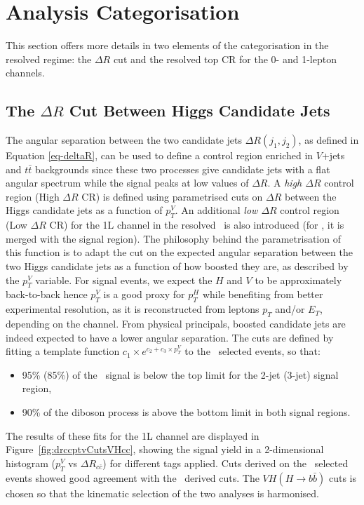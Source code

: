 \clearpage
\section{Analysis Categorisation}\label{ap-vhCat}
This section offers more details in two elements of the categorisation in the resolved regime: the $\Delta R$ cut and the resolved top CR for the 0- and 1-lepton channels.

\subsection{The $\Delta R$ Cut Between Higgs Candidate Jets}\label{ap-sec-vh-deltaR}
The angular separation between the two candidate jets $\Delta R(j_1, j_2)$, as defined in Equation \ref{eq-deltaR}, can be used to define a control region enriched in $V$+jets and $t\bar{t}$ backgrounds since these two processes give candidate jets with a flat angular spectrum while the signal peaks at low values of $\Delta R$. A \textit{high $\Delta R$} control region (High $\Delta R$ CR) is defined using parametrised cuts on $\Delta R$ between the Higgs candidate jets as a function of $p_T^V$. An additional \textit{low $\Delta R$} control region (Low $\Delta R$ CR) for the 1L channel in the resolved \vhb\ is also introduced (for \vhc, it is merged with the signal region). The philosophy behind the parametrisation of this function is to adapt the cut on the expected angular separation between the two Higgs candidate jets as a function of how boosted they are, as described by the $p_T^V$ variable. For signal events, we expect the $H$ and $V$ to be approximately back-to-back hence $p_T^V$ is a good proxy for $p_T^H$ while benefiting from better experimental resolution, as it is reconstructed from leptons $p_T$ and/or $E_T$, depending on the channel. From physical principals, boosted candidate jets are indeed expected to have a lower angular separation. The cuts are defined by fitting a template function $ c_1 \times e^{c_2 + c_3 \times p_T^V}$ to the \vhb\ selected events, so that:   
\begin{itemize}
\item 95\% (85\%) of the \vhb\ signal is below the top limit for the 2-jet (3-jet) signal region,
\item 90\% of the diboson process is above the bottom limit in both signal regions.
\end{itemize}

The results of these fits for the 1L channel are displayed in Figure~\ref{fig:drccptvCutsVHcc}, showing the signal yield in a 2-dimensional histogram ($p_T^V$ vs $\Delta R_{c\bar{c}}$) for different tags applied. Cuts derived on the \vhc\ selected events showed good agreement with the \vhb\ derived cuts. The $VH(H\rightarrow b\bar{b})$ cuts is chosen so that the kinematic selection of the two analyses is harmonised. \\

